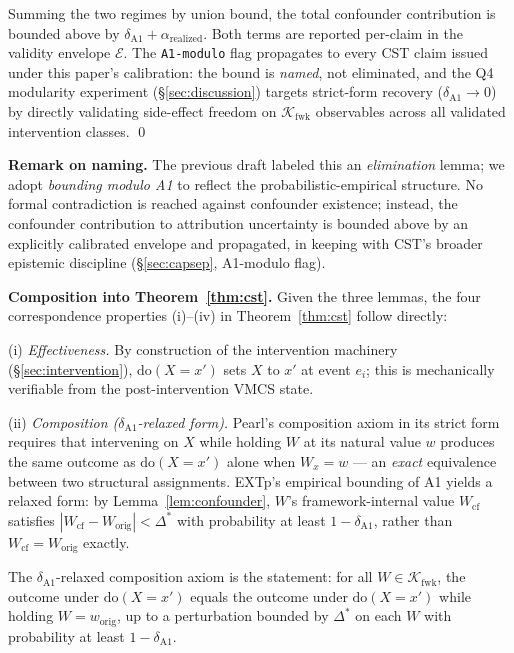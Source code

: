 \documentclass[conference]{IEEEtran}
\newcommand{\Kfwk}{\mathcal{K}_\text{fwk}}
\newcommand{\Dstar}{\Delta^{*}}
\newcommand{\arealized}{\alpha_\text{realized}}
\newcommand{\dox}[1]{\text{do}(X{=}#1)}
\begin{document}
Summing the two regimes by union bound, the total confounder
contribution is bounded above by
$\delta_{\text{A1}} + \arealized$. Both terms are reported
per-claim in the validity envelope $\mathcal{E}$. The
\texttt{A1-modulo} flag propagates to every CST claim issued under
this paper's calibration: the bound is \emph{named}, not
eliminated, and the Q4 modularity experiment
(\S\ref{sec:discussion}) targets strict-form recovery
($\delta_{\text{A1}} \to 0$) by directly validating side-effect
freedom on $\Kfwk$ observables across all validated intervention
classes. \qed

\textbf{Remark on naming.} The previous draft labeled this an
\emph{elimination} lemma; we adopt \emph{bounding modulo A1} to
reflect the probabilistic-empirical structure. No formal
contradiction is reached against confounder existence; instead,
the confounder contribution to attribution uncertainty is bounded
above by an explicitly calibrated envelope and propagated, in
keeping with CST's broader epistemic discipline
(\S\ref{sec:capsep}, A1-modulo flag).

\textbf{Composition into Theorem~\ref{thm:cst}.} Given the three
lemmas, the four correspondence properties (i)--(iv) in
Theorem~\ref{thm:cst} follow directly:

(i) \emph{Effectiveness.} By construction of the intervention
machinery (\S\ref{sec:intervention}), $\dox{x'}$ sets $X$ to
$x'$ at event $e_i$; this is mechanically verifiable from the
post-intervention VMCS state.

(ii) \emph{Composition ($\delta_{\text{A1}}$-relaxed form).}
Pearl's composition axiom in its strict form requires that
intervening on $X$ while holding $W$ at its natural value $w$
produces the same outcome as $\dox{x'}$ alone when $W_x = w$ ---
an \emph{exact} equivalence between two structural assignments.
EXTp's empirical bounding of A1 yields a relaxed form: by
Lemma~\ref{lem:confounder}, $W$'s framework-internal value
$W_{\text{cf}}$ satisfies $|W_{\text{cf}} - W_{\text{orig}}| <
\Dstar$ with probability at least $1 - \delta_{\text{A1}}$, rather
than $W_{\text{cf}} = W_{\text{orig}}$ exactly.

The $\delta_{\text{A1}}$-relaxed composition axiom is the
statement: for all $W \in \Kfwk$, the outcome under $\dox{x'}$
equals the outcome under $\dox{x'}$ while holding
$W = w_{\text{orig}}$, up to a perturbation bounded by $\Dstar$
on each $W$ with probability at least $1 - \delta_{\text{A1}}$.
\end{document}
